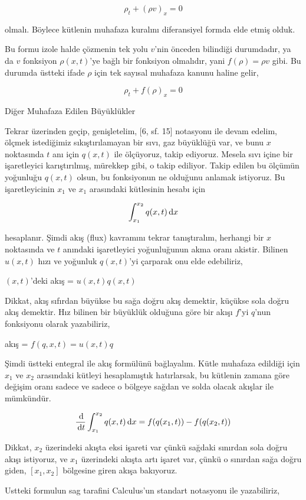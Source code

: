 \documentclass[12pt,fleqn]{article}\usepackage{../../common}
\begin{document}
$$
\rho_t + (\rho v)_x = 0
$$

olmalı. Böylece kütlenin muhafaza kuralını diferansiyel formda elde etmiş olduk.

Bu formu izole halde çözmenin tek yolu $v$'nin önceden bilindiği durumdadır, ya
da $v$ fonksiyon $\rho(x,t)$'ye bağlı bir fonksiyon olmalıdır, yani
$f(\rho) = \rho v$ gibi. Bu durumda üstteki ifade $\rho$ için tek sayısal
muhafaza kanunu haline gelir,

$$
\rho_t + f(\rho)_x = 0
$$

Diğer Muhafaza Edilen Büyüklükler

Tekrar üzerinden geçip, genişletelim, [6, sf. 15] notasyonu ile devam edelim,
ölçmek istediğimiz sıkıştırılamayan bir sıvı, gaz büyüklüğü var, ve bunu $x$
noktasında $t$ anı için $q(x,t)$ ile ölçüyoruz, takip ediyoruz. Mesela sıvı
içine bir işaretleyici karıştırılmış, mürekkep gibi, o takip ediliyor. Takip
edilen bu ölçümün yoğunluğu $q(x,t)$ olsun, bu fonksiyonun ne olduğunu anlamak
istiyoruz. Bu işaretleyicinin $x_1$ ve $x_1$ arasındaki kütlesinin hesabı için

$$
\int _{x_1}^{x_2} q(x,t) \,\mathrm{d} x
$$

hesaplanır. Şimdi akış (flux) kavramını tekrar tanıştıralım, herhangi bir $x$
noktasında ve $t$ anındaki işaretleyici yoğunluğunun akma oranı akistir.
Bilinen $u(x,t)$ hızı ve yoğunluk $q(x,t)$'yi çarparak onu elde edebiliriz,

$(x,t)$'deki akış  = $u(x,t) q(x,t)$

Dikkat, akış sıfırdan büyükse bu sağa doğru akış demektir, küçükse sola doğru
akış demektir. Hız bilinen bir büyüklük olduğuna göre bir akışı $f$'yi $q$'nun
fonksiyonu olarak yazabiliriz,

akış = $f(q,x,t) = u(x,t) q$ 

Şimdi üstteki entegral ile akış formülünü bağlayalım. Kütle muhafaza edildiği
için $x_1$ ve $x_2$ arasındaki kütleyi hesaplamıştık hatırlarsak, bu kütlenin
zamana göre değişim oranı sadece ve sadece o bölgeye sağdan ve solda olacak
akışlar ile mümkündür.

$$
\frac{\,\mathrm{d}}{\,\mathrm{d} t} \int _{x_1}^{x_2} q(x,t) \,\mathrm{d} x =
f(q(x_1,t)) - f(q(x_2,t)) 
$$

Dikkat, $x_2$ üzerindeki akışta eksi işareti var çünkü sağdaki sınırdan
sola doğru akışı istiyoruz, ve $x_1$ üzerindeki akışta artı işaret var,
çünkü o sınırdan sağa doğru giden, $[x_1,x_2]$ bölgesine giren akışa
bakıyoruz.

Ustteki formulun sag tarafini Calculus'un standart notasyonu ile yazabiliriz,
\end{document}
